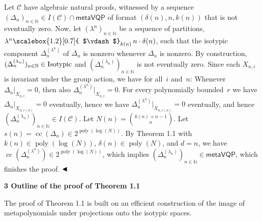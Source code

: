 \documentclass[10pt,a4paper]{article}
\begin{document}
Let $\mathcal{C}$ have algebraic natural proofs, witnessed by a sequence $(\Delta_{n})_{n\in\mathbb{N}}\in I(\mathcal{C})\mathop{\cap}\mathsf{metaVQP}$ of format $(\delta(n),n,k(n))$ that is not eventually zero.
Now, let $(\lambda^{n})_{n\in\mathbb{N}}$ be a sequence of partitions, $\lambda^{n}\mathchoice{\scalebox{1.2}[0.7]{ $\vdash$}_{k(n)}\,}{\scalebox{1.2}[0.7]{ $\vdash$}_{k(n)}\,}{\scalebox{0.7}{\scalebox{1.2}[0.7]{$\vdash$}}_{k(n)}\,}{\scalebox{0.5}{\scalebox{1.2}[0.7]{$\vdash$}}_{k(n)}\,}{n\cdot\delta(n)}$, such that the isotypic component $\Delta_{n}^{(\lambda^{n})}$ of $\Delta_{n}$ is nonzero whenever $\Delta_{n}$ is nonzero.
By construction, $(\Delta_{n}^{(\lambda_{n})})_{n\in\mathbb{N}}\in\textup{{Isotypic}}$ and $(\Delta_{n}^{(\lambda_{n})})_{n\in\mathbb{N}}$ is not eventually zero.
Since each $X_{n,i}$ is invariant under the group action, we have for all $i$ and $n$:
Whenever $\Delta_{n}|_{X_{n,i}}=0$, then also $\Delta_{n}^{(\lambda^{n})}|_{X_{n,i}}=0$.
For every polynomially bounded $r$ we have
$\Delta_{n}|_{X_{n,r(n)}}=0$ eventually,
hence we have $\Delta_{n}^{(\lambda^{n})}|_{X_{n,r(n)}}=0$ eventually, and hence $(\Delta_{n}^{(\lambda_{n})})_{n\in\mathbb{N}}\in I(\mathcal{C})$.
Let $N(n)=\binom{k(n)+n-1}{n}$.
Let $s(n)=\operatorname{cc}(\Delta_{n})\in 2^{\operatorname{poly}(\log(N))}$.
By Theorem 1.1
with $k(n)\in\operatorname{poly}(\log(N))$, $\delta(n)\in\operatorname{poly}(N)$, and $d=n$, we
have $\operatorname{cc}(\Delta^{(\lambda^{n})}_{n})\in 2^{\operatorname{poly}(\log(N))}$,
which implies $(\Delta_{n}^{(\lambda_{n})})_{n\in\mathbb{N}}\in\mathsf{metaVQP}$,
which finishes the proof.
$\hfill\blacktriangleleft$








\par\medskip\noindent\textbf{3 Outline of the proof of Theorem 1.1}\par




The proof of Theorem 1.1 is built on an efficient construction of the image of metapolynomials under projections onto the isotypic spaces.
\end{document}
